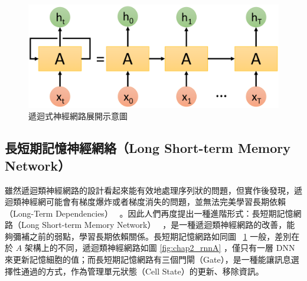 \begin{figure}[h]
    \centering
    \includegraphics[scale=0.3]{images/chap2_unrollrnn.png}
    \caption{遞迴式神經網路展開示意圖}\label{fig:chap2_unrollrnn}
\end{figure}

\subsection{長短期記憶神經網絡（Long Short-term Memory Network）}
雖然遞迴類神經網路的設計看起來能有效地處理序列狀的問題，但實作後發現，遞迴類神經網可能會有梯度爆炸或者梯度消失的問題，並無法完美學習長期依賴（Long-Term Dependencies）~\cite{bengio1994learning} 。因此人們再度提出一種進階形式：長短期記憶網路（Long Short-term Memory Network）~\cite{hochreiter1997long} ，是一種遞迴類神經網路的改善，能夠彌補之前的弱點，學習長期依賴關係。長短期記憶網路如同圖 ~\ref{fig:chap2_unrollrnn} 一般，差別在於 $A$ 架構上的不同，遞迴類神經網路如圖 \ref{fig:chap2_rnnA} ，僅只有一層 DNN 來更新記憶細胞的值；而長短期記憶網路有三個門閘（Gate），是一種能讓訊息選擇性通過的方式，作為管理單元狀態（Cell State）的更新、移除資訊。

